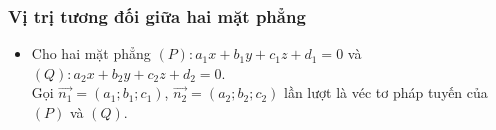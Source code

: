 \subsubsection{Vị trị tương đối giữa hai mặt phẳng}
\begin{itemize}
	\item [] Cho hai mặt phẳng $(P) \colon a_1x + b_1y + c_1z + d_1=0$ và $(Q) \colon a_2x + b_2y + c_2z + d_2=0$. \\
	Gọi $\vec{n_1}=(a_1;b_1;c_1)$, $\vec{n_2}=(a_2;b_2;c_2)$ lần lượt là véc tơ pháp tuyến của $(P)$ và $(Q)$.\\
	\begin{boxdn}
	\end{boxdn}  
\end{itemize}

